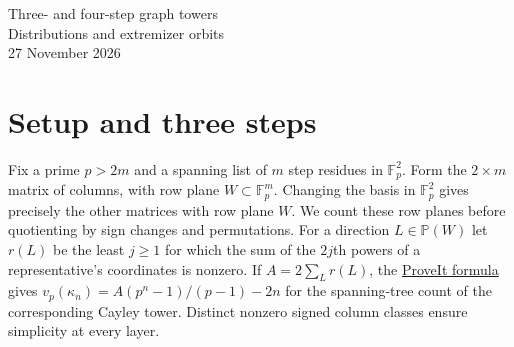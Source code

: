 \documentclass[11pt]{article}
\newcommand{\F}{\mathbb F}
\newcommand{\PP}{\mathbb P}
\begin{document}
\begin{center}
{\LARGE Three- and four-step graph towers}\\[3pt]
{\large Distributions and extremizer orbits}\\[6pt]
{\small 27 November 2026}
\end{center}
\begin{abstract}
We give the full three-step valuation distribution, including a
classification of the three extremizer orbits when $p\equiv1\bmod6$.
For four steps with identically zero quadratic moment we compute the
distribution from a finite-field curve point count and classify the
extremizers when $p\equiv1\bmod8$. The four-step maximum itself is
already known from the cited ProveIt report.
\end{abstract}

\section{Setup and three steps}
Fix a prime $p>2m$ and a spanning list of $m$ step residues in
$\F_p^2$. Form the $2\times m$ matrix of columns, with row plane
$W\subset\F_p^m$. Changing the basis in $\F_p^2$ gives precisely
the other matrices with row plane $W$. We count these row planes
before quotienting by sign changes and permutations.
For a direction $L\in\PP(W)$ let $r(L)$ be the least $j\ge1$
for which the sum of the $2j$th powers of a representative's
coordinates is nonzero. If $A=2\sum_L r(L)$, the
\href{https://github.com/VladimirReshetnikov/ProveIt/blob/21c0252ffe8611baa0fbf528fbb003d6c42ca9af/Analysis/GeneralizedRiemannHypothesis/Research/grh_transfers_lubin_tate_and_graph_towers/graphs.tex}{ProveIt formula}
gives $v_p(\kappa_n)=A(p^n-1)/(p-1)-2n$ for the spanning-tree
count of the corresponding Cayley tower.
Distinct nonzero signed column classes ensure simplicity at every layer.
\end{document}
